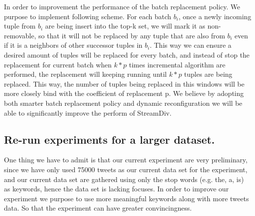 In order to improvement the performance of the batch replacement policy. We purpose to implement following scheme. For each batch $b_i$, once a newly incoming tuple from $b_i$ are being insert into the top-k set, we will mark it as non-removable, so that it will not be replaced by any tuple that are also from $b_i$ even if it is a neighbors of other successor tuples in $b_i$. This way we can ensure a desired amount of tuples will be replaced for every batch, and instead of stop the replacement for current batch when $k * p$ times incremental algorithm are performed, the replacement will keeping running until $k*p$ tuples are being replaced. This way, the number of tuples being replaced in this windows will be more closely bind with the coefficient of replacement p. We believe by adopting both smarter batch replacement policy and dynamic reconfiguration we will be able to significantly improve the perform of StreamDiv.

\subsection{Re-run experiments for a larger dataset.}

One thing we have to admit is that our current experiment are very preliminary, since we have only used 75000 tweets as our current data set for the experiment, and our current data set are gathered using only the stop words (e.g. the, a, is) as keywords, hence the data set is lacking focuses. In order to improve our experiment we purpose to use more meaningful keywords along with more tweets data. So that the experiment can have greater convincingness. 

